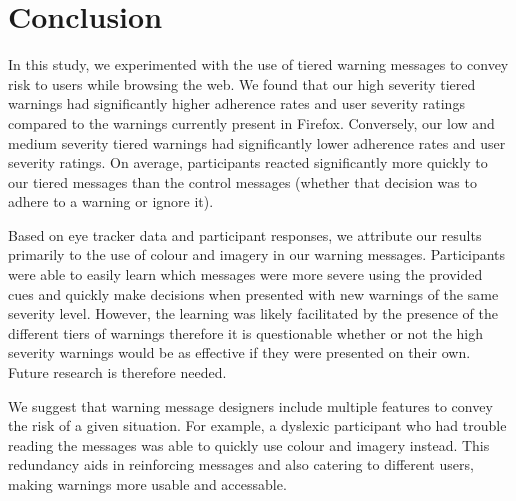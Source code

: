 \chapter{Conclusion}
\label{Conclusion}

In this study, we experimented with the use of tiered warning messages to convey risk to users while browsing the web. We found that our high severity tiered warnings had significantly higher adherence rates and user severity ratings compared to the warnings currently present in Firefox. Conversely, our low and medium severity tiered warnings had significantly lower adherence rates and user severity ratings. On average, participants reacted significantly more quickly to our tiered messages than the control messages (whether that decision was to adhere to a warning or ignore it).

Based on eye tracker data and participant responses, we attribute our results primarily to the use of colour and imagery in our warning messages. Participants were able to easily learn which messages were more severe using the provided cues and quickly make decisions when presented with new warnings of the same severity level. However, the learning was likely facilitated by the presence of the different tiers of warnings therefore it is questionable whether or not the high severity warnings would be as effective if they were presented on their own. Future research is therefore needed.

We suggest that warning message designers include multiple features to convey the risk of a given situation. For example, a dyslexic participant who had trouble reading the messages was able to quickly use colour and imagery instead. This redundancy aids in reinforcing messages and also catering to different users, making warnings more usable and accessable.
